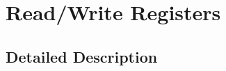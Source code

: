 \hypertarget{group__readwrite}{}\section{Read/\+Write Registers}
\label{group__readwrite}


\subsection{Detailed Description}
